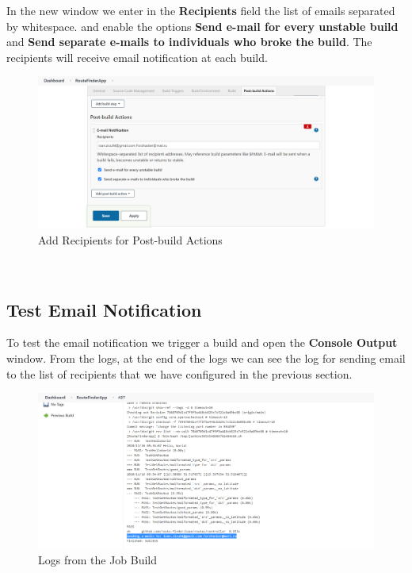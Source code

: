 \documentclass[12pt,a4paper,twoside]{article}
\begin{document}
In the new window we enter in the \textbf{Recipients} field the list of emails separated by whitespace. and enable the options \textbf{Send e-mail for every unstable build} and \textbf{Send separate e-mails to individuals who broke the build}.
The recipients will receive email notification at each build.


\begin{figure}[H]
    \centering
        \includegraphics[width=15cm]{images-aws/56-email-notification-post-build-action.png}
        \caption{Add Recipients for Post-build Actions}
\end{figure}




~\newpage


\subsection{Test Email Notification}


To test the email notification we trigger a build and open the \textbf{Console Output} window. From the logs, at the end of the logs we can see the log for sending email to the list of recipients that we have configured in the previous section.


\begin{figure}[H]
    \centering
        \includegraphics[width=15cm]{images-aws/57-email-notification-trigger-build.png}
        \caption{Logs from the Job Build}
\end{figure}
\end{document}
